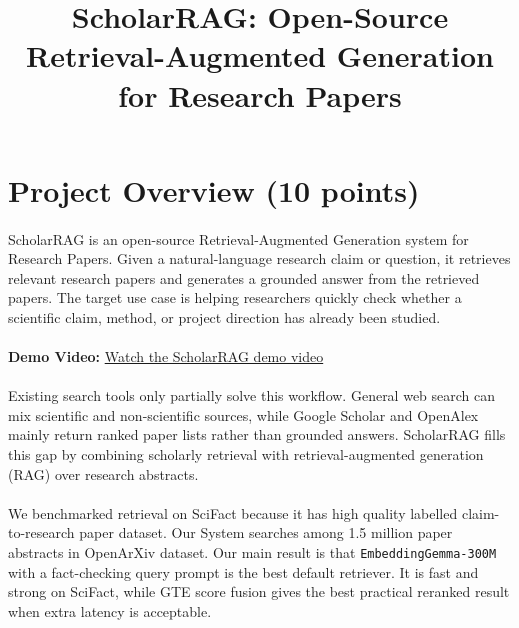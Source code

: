 \documentclass[11pt,a4paper]{article}
\begin{document}
\title{ScholarRAG: Open-Source Retrieval-Augmented Generation for Research Papers}



\maketitle

\section{Project Overview (10 points)}

\paragraph{}ScholarRAG is an open-source Retrieval-Augmented Generation system for Research Papers. Given a natural-language research claim or question, it retrieves relevant research papers and generates a grounded answer from the retrieved papers. The target use case is helping researchers quickly check whether a scientific claim, method, or project direction has already been studied.

\paragraph{}\textbf{Demo Video:} \href{https://drive.google.com/file/d/1_riQurc5qV0zHV-0BXhmatl7tSVzinaY/view}{Watch the ScholarRAG demo video}

\paragraph{}Existing search tools only partially solve this workflow. General web search can mix scientific and non-scientific sources, while Google Scholar and OpenAlex mainly return ranked paper lists rather than grounded answers. ScholarRAG fills this gap by combining scholarly retrieval with retrieval-augmented generation (RAG) over research abstracts.

\paragraph{}We benchmarked retrieval on SciFact because it has high quality labelled claim-to-research paper dataset. Our System searches among 1.5 million paper abstracts in OpenArXiv dataset. Our main result is that \texttt{EmbeddingGemma-300M} with a fact-checking query prompt is the best default retriever. It is fast and strong on SciFact, while GTE score fusion gives the best practical reranked result when extra latency is acceptable.
\end{document}
